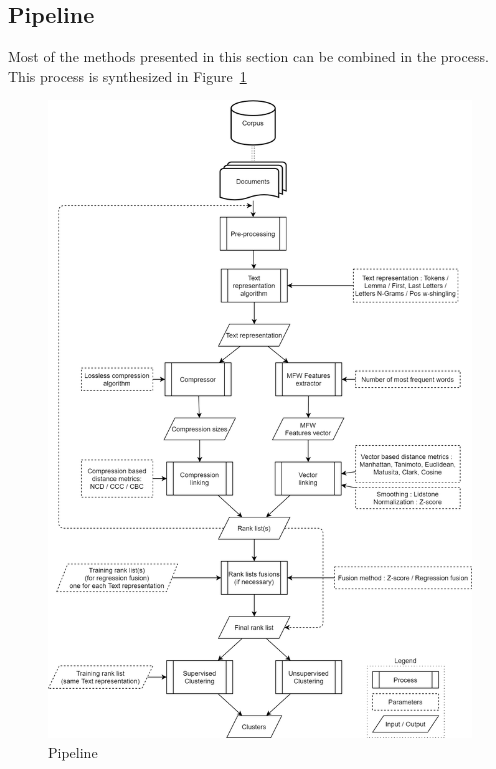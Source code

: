 \subsection{Pipeline}

Most of the methods presented in this section can be combined in the process. This process is synthesized in Figure~\ref{fig:pipeline}

\onecolumn
\begin{figure}[p]
  \centering
  \caption{Pipeline}
  \label{fig:pipeline}
  \includegraphics[width=\textwidth,height=\textheight,keepaspectratio]{img/pipeline.png}
\end{figure}
\twocolumn
